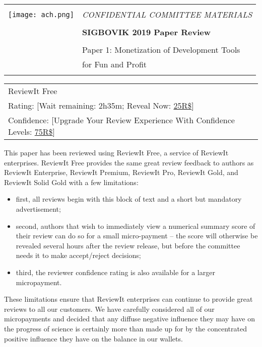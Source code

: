 \documentclass[10pt]{article}
\begin{document}
{\sffamily
\begin{tabular}{ll}
\multirow{3}{*}{\texttt{[image: ach.png]}}\\
& \Large{\em CONFIDENTIAL COMMITTEE MATERIALS} \\
&\\
& \textbf{\Huge{SIGBOVIK 2019 Paper Review}} \\
&\\
& \LARGE{Paper 1: Monetization of Development Tools} \\[0.25em]
& \LARGE{for Fun and Profit} \\
\\
\hline
\end{tabular}}
\vspace{1em}
\thispagestyle{empty}

{\large\bf
\begin{tabular}{l}
ReviewIt Free\\
Rating: [Wait remaining: 2h35m; Reveal Now: \underline{25R\$}]\\
Confidence: [Upgrade Your Review Experience With Confidence Levels: \underline{75R\$}]\\
\end{tabular}}
\vspace{1em}

This paper has been reviewed using ReviewIt Free, a service of ReviewIt enterprises.
ReviewIt Free provides the same great review feedback to authors as ReviewIt Enterprise, ReviewIt Premium, ReviewIt Pro, ReviewIt Gold, and ReviewIt Solid Gold with a few limitations:
\vspace{-1em}
\begin{itemize}
\item first, all reviews begin with this block of text and a short but mandatory advertisement;
\item second, authors that wish to immediately view a numerical summary score of their review can do so for a small micro-payment -- the score will otherwise be revealed several hours after the review release, but before the committee needs it to make accept/reject decisions;
\item third, the reviewer confidence rating is also available for a larger micropayment.
\end{itemize}

These limitations ensure that ReviewIt enterprises can continue to provide great reviews to all our customers.
We have carefully considered all of our micropayments and decided that any diffuse negative influence they may have on the progress of science is certainly more than made up for by the concentrated positive influence they have on the balance in our wallets.\\
\end{document}
